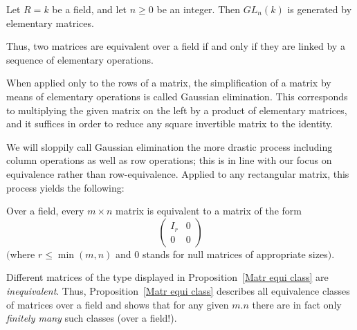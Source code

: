 \begin{proposition}
Let $R=k$ be a field, and let $n\geq 0$ be an integer. Then $GL_n(k)$ is generated by elementary matrices.\par
Thus, two matrices are equivalent over a field if and only if they are linked by a sequence of elementary operations.
\end{proposition}
When applied only to the rows of a matrix, the simplification of a matrix by means of elementary operations is called Gaussian elimination. This corresponds to multiplying the given matrix on the left by a product of elementary matrices, and it suffices in order to reduce any square invertible matrix to the identity.\par
We will sloppily call Gaussian elimination the more drastic process including column operations as well as row operations; this is in line with our focus on equivalence rather than row-equivalence. Applied to any rectangular matrix, this process yields the following:
\begin{proposition}\label{Matr equi class}
Over a field, every $m\times n$ matrix is equivalent to a matrix of the form
\[\begin{pmatrix}
I_r&0\\
0&0
\end{pmatrix}\]
$($where $r\leqslant\min(m,n)$ and $0$ stands for null matrices of appropriate sizes$)$.
\end{proposition}
Different matrices of the type displayed in Proposition~\ref{Matr equi class} are \textit{inequivalent}. Thus, Proposition~\ref{Matr equi class} describes all equivalence classes of matrices over a field and shows that for any given $m.n$ there are in fact only \textit{finitely many} such classes (over a field!).
